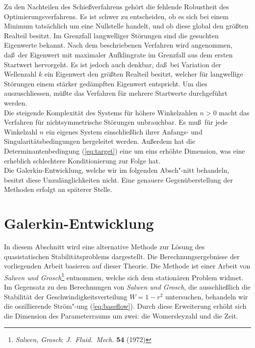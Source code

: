 \documentclass[10pt,a5paper,oneside,draft]{book}
\numberwithin{equation}{chapter}
\begin{document}
Zu den Nachteilen des Schie\ss verfahrens geh\"ort die fehlende Robustheit des Optimierungsverfahrens.
Es ist schwer zu entscheiden, ob es sich bei einem Minimum tats\"achlich um eine Nullstelle handelt, und ob diese global den gr\"o\ss ten Realteil besitzt.
Im Grenzfall langwelliger St\"orungen sind die gesuchten Eigenwerte bekannt.
Nach dem beschriebenen Verfahren wird angenommen, da\ss\ der Eigenwert mit maximaler Aufklingrate im Grenzfall aus dem ersten Startwert hervorgeht.
Es ist jedoch auch denkbar, da\ss\ bei Variation der Wellenzahl $k$ ein Eigenwert den gr\"o\ss ten Realteil besitzt, welcher f\"ur langwellige St\"orungen einem st\"arker ged\"ampften Eigenwert entspricht.
Um dies auszuschliessen, m\"u\ss te das Verfahren f\"ur mehrere Startwerte durchgef\"uhrt werden.\\
Die steigende Komplexit\"at des Systems f\"ur h\"ohere Winkelzahlen $n>0$ macht das Verfahren f\"ur nichtsymmetrische St\"orungen unbrauchbar.
Es mu\ss\ f\"ur jede Winkelzahl $n$ ein eigenes System einschlie\ss lich ihrer Anfangs- und Singularit\"atsbedingungen hergeleitet werden.
Au\ss erdem hat die Determinantenbedingung (\mbox{\ref{eq:target}}) eine um eins erh\"ohte Dimension, was eine erheblich schlechtere Konditionierung zur Folge hat.\\

Die Galerkin-Entwicklung, welche wir im folgenden Absch"-nitt behandeln, besitzt diese Unzul\"anglichkeiten nicht.
Eine genauere Gegen\"uberstellung der Methoden erfolgt an sp\"aterer Stelle.
\newpage

\section{Galerkin-Entwicklung}\label{sec:galerkin}
In diesem Abschnitt wird eine alternative Methode zur L\"osung des quasistatischen Stabilit\"atsproblems dargestellt.
Die Berechnungsergebnisse der vorliegenden Arbeit basieren auf dieser Theorie.
Die Methode ist einer Arbeit von \textsl{Salwen und Grosch}\footnote{\label{bib:salwen_grosch:2}\textsl{Salwen, Grosch}: \textit{J.\ Fluid.\ Mech.} \textbf{54} (1972)} entnommen, welche sich dem station\"aren Problem widmet.\\
Im Gegensatz zu den Berechnungen von \textsl{Salwen und Grosch}, die ausschlie\ss lich die Stabilit\"at der Geschwindigkeitsverteilung $W=1-r^2$ untersuchen, behandeln wir die oszillierende Str\"om"-ung (\mbox{\ref{eq:baseflow}}).
Durch diese Erweiterung erh\"oht sich die Dimension des Parameterraums um zwei: die Womersleyzahl und die Zeit.\\
\end{document}

